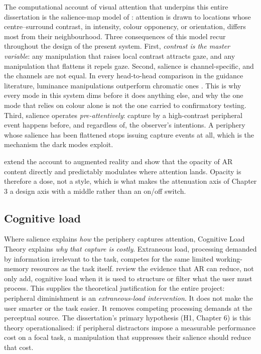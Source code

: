The computational account of visual attention that underpins this entire dissertation is the
salience-map model of \citet{itti1998}: attention is drawn to locations whose
centre–surround contrast, in intensity, colour opponency, or orientation, differs most from their
neighbourhood. Three consequences of this model recur throughout the design of the present system.
First, \textit{contrast is the master variable}: any manipulation that raises local contrast attracts gaze,
and any manipulation that flattens it repels gaze. Second, salience is channel-specific, and the
channels are not equal. In every head-to-head comparison in the guidance literature, luminance
manipulations outperform chromatic ones \citep{bailey2009,grogorick2017}. This is why
every mode in this system dims before it does anything else, and why the one mode that relies on
colour alone is not the one carried to confirmatory testing. Third, salience operates
\textit{pre-attentively}: capture by a high-contrast peripheral event happens before, and regardless
of, the observer's intentions. A periphery whose salience has been flattened stops issuing capture
events at all, which is the mechanism the dark modes exploit.

\citet{duan2022} extend the account to augmented reality and show that the opacity of AR content
directly and predictably modulates where attention lands. Opacity is therefore a dose, not a style,
which is what makes the attenuation axis of Chapter 3 a design axis with a middle rather than an
on/off switch.

\subsection{Cognitive load}

Where salience explains \textit{how} the periphery captures attention, Cognitive Load Theory explains \textit{why
that capture is costly}. Extraneous load, processing demanded by information irrelevant to the task,
competes for the same limited working-memory resources as the task itself. \citet{buchner2022} review the evidence that AR can reduce, not only add, cognitive load when it is used to
structure or filter what the user must process. This supplies the theoretical justification for the entire
project: peripheral diminishment is an \textit{extraneous-load intervention}. It does not make the user
smarter or the task easier. It removes competing processing demands at the perceptual source. The
dissertation's primary hypothesis (H1, Chapter 6) is this theory operationalised: if peripheral
distractors impose a measurable performance cost on a focal task, a manipulation that suppresses
their salience should reduce that cost.

